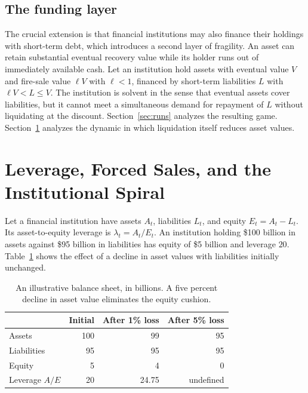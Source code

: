 \documentclass[11pt]{article}
\theoremstyle{definition}
\theoremstyle{remark}
\begin{document}
\subsection{The funding layer}

The crucial extension is that financial institutions may also finance their holdings with short-term debt, which introduces a second layer of fragility. An asset can retain substantial eventual recovery value while its holder runs out of immediately available cash. Let an institution hold assets with eventual value $V$ and fire-sale value $\ell V$ with $\ell<1$, financed by short-term liabilities $L$ with $\ell V<L\le V$. The institution is solvent in the sense that eventual assets cover liabilities, but it cannot meet a simultaneous demand for repayment of $L$ without liquidating at the discount. Section~\ref{sec:runs} analyzes the resulting game. Section~\ref{sec:leverage} analyzes the dynamic in which liquidation itself reduces asset values.

\section{Leverage, Forced Sales, and the Institutional Spiral}\label{sec:leverage}

Let a financial institution have assets $A_t$, liabilities $L_t$, and equity $E_t=A_t-L_t$. Its asset-to-equity leverage is $\lambda_t=A_t/E_t$. An institution holding \$100 billion in assets against \$95 billion in liabilities has equity of \$5 billion and leverage $20$. Table~\ref{tab:balance} shows the effect of a decline in asset values with liabilities initially unchanged.

\begin{table}[ht]
\centering
\begin{tabular}{lrrr}
\toprule
 & Initial & After 1\% loss & After 5\% loss \\
\midrule
Assets & 100 & 99 & 95 \\
Liabilities & 95 & 95 & 95 \\
Equity & 5 & 4 & 0 \\
Leverage $A/E$ & 20 & 24.75 & undefined \\
\bottomrule
\end{tabular}
\caption{An illustrative balance sheet, in billions. A five percent decline in asset value eliminates the equity cushion.}\label{tab:balance}
\end{table}
\end{document}
